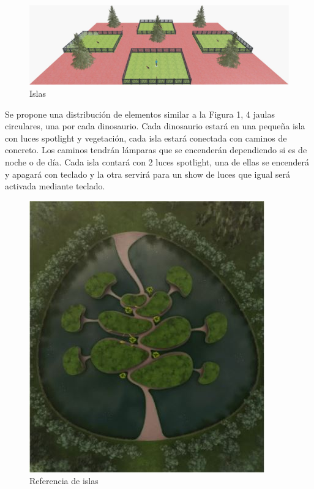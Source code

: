 \documentclass[12pt]{article} %
\begin{document}
	\begin{figure}[h]
		\begin{center}
			\includegraphics[scale=0.485]{images/Propuesta3D.jpg}
			\caption{Islas}
		\end{center}  		
	\end{figure}
	
	\setlength{\parindent}{1.0cm}
	Se propone una distribución de elementos similar a la Figura 1, 4 jaulas circulares, una por cada dinosaurio. 
	Cada dinosaurio estará en una pequeña isla con luces spotlight y vegetación, 
	cada isla estará conectada con caminos de concreto. 
	Los caminos tendrán lámparas que se encenderán dependiendo si es de noche o de día. 
	Cada isla contará con 2 luces spotlight, una de ellas se encenderá y apagará con teclado y la otra servirá para 
	un show de luces que igual será activada mediante teclado.
	\setlength{\parindent}{0.0cm}
	
	\begin{figure}[h]
		\begin{center}
			\includegraphics[scale=0.5]{images/Isla.JPG}
		\caption{Referencia de islas}
		\end{center}  		
	\end{figure}
	
\end{document}
